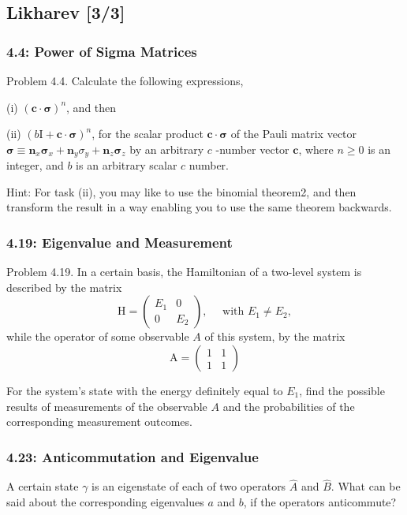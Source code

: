 \documentclass[11pt]{article}
\begin{document}
\subsection{Likharev [3/3]}
\label{sec:orgf3b019e}
\subsubsection{4.4: Power of Sigma Matrices}
\label{sec:orge6feac2}
Problem 4.4. Calculate the following expressions,

(i) \((\mathbf{c} \cdot \boldsymbol{\sigma})^n\), and then

(ii) \((b \mathrm{I}+\mathbf{c} \cdot \boldsymbol{\sigma})^n\), for the scalar product
\(\mathbf{c} \cdot \boldsymbol{\sigma}\) of the Pauli matrix vector \(\boldsymbol{\sigma} \equiv
\mathbf{n}_x \boldsymbol{\sigma}_x+\mathbf{n}_y \sigma_y+\mathbf{n}_z \boldsymbol{\sigma}_z\) by
an arbitrary \(c\) -number vector \(\mathbf{c}\), where \(n \geqslant 0\) is an integer, and
\(b\) is an arbitrary scalar \(c\) number.

Hint: For task (ii), you may like to use
the binomial theorem2, and then transform the result in a way enabling you to
use the same theorem backwards.
\subsubsection{4.19: Eigenvalue and Measurement}
\label{sec:org7b10c46}
Problem 4.19. In a certain basis, the Hamiltonian of a two-level system is
described by the matrix $$ \mathrm{H}=\left(\begin{array}{cc} E_1 & 0 \\ 0 & E_2
\end{array}\right), \quad \text { with } E_1 \neq E_2, $$ while the operator of
some observable \(A\) of this system, by the matrix $$
\mathrm{A}=\left(\begin{array}{ll} 1 & 1 \\ 1 & 1 \end{array}\right) $$

For the system's state with the energy definitely equal to \(E_1\), find the
possible results of measurements of the observable \(A\) and the probabilities of
the corresponding measurement outcomes.
\subsubsection{4.23: Anticommutation and Eigenvalue}
\label{sec:org6579b67}
A certain state \(\gamma\) is an eigenstate of each of two operators
\(\hat{A}\) and \(\hat{B}\). What can be said about the corresponding eigenvalues
\(a\) and \(b\), if the operators anticommute?
\end{document}
